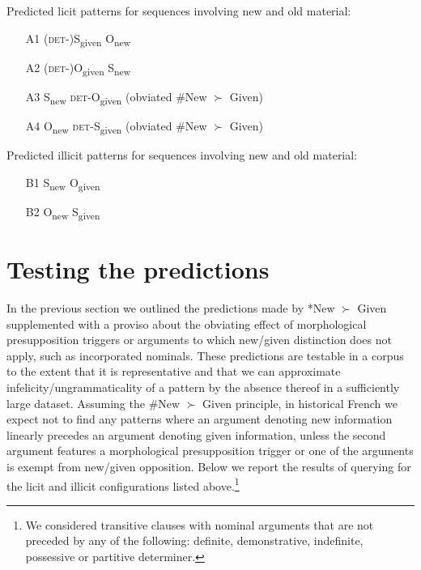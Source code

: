 \documentclass[output=paper,modfonts,nonflat]{langsci/langscibook}
\begin{document}
\ea
Predicted licit patterns for sequences involving new and old material: \label{licit}\\
\begin{itemize}
\item[A1] ({\scshape det}-)S\textsubscript{given} O\textsubscript{new}
\item[A2] ({\scshape det}-)O\textsubscript{given} S\textsubscript{new}
\item[A3] S\textsubscript{new} {\scshape det}-O\textsubscript{given} \hfill (obviated \#New $\succ$ Given)
\item[A4] O\textsubscript{new} {\scshape det}-S\textsubscript{given} \hfill (obviated \#New $\succ$ Given)
\end{itemize}
\z

\pagebreak

\ea
Predicted illicit patterns for sequences involving new and old material: \label{illicit}\\
\begin{itemize}
\item[B1] S\textsubscript{new} O\textsubscript{given}
\item[B2] O\textsubscript{new} S\textsubscript{given}
\end{itemize}
\z


\section{Testing the predictions}
\label{section:predictions}

In the previous section we outlined the predictions made by *New $\succ$ Given supplemented with a proviso about the obviating effect of morphological presupposition triggers or arguments to which new/given distinction does not apply, such as incorporated nominals. These predictions are testable in a corpus to the extent that it is representative and that we can approximate infelicity/ungrammaticality of a pattern by the absence thereof in a sufficiently large dataset. Assuming the \#New $\succ$ Given principle, in historical French we expect not to find any patterns where an argument denoting new information linearly precedes an argument denoting given information, unless the second argument features a morphological presupposition trigger or one of the arguments is exempt from new/given opposition. Below we report the results of querying for the licit and illicit configurations listed above.\footnote{We considered transitive clauses with nominal arguments that are not preceded by any of the following: definite, demonstrative, indefinite, possessive or partitive determiner.}
\end{document}

